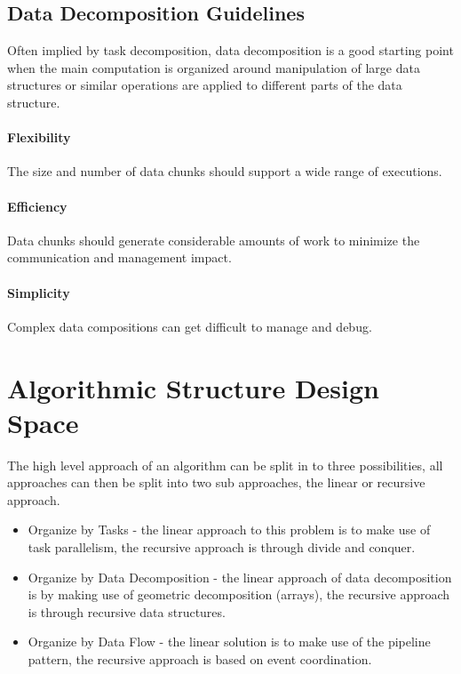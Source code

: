 \subsection{Data Decomposition Guidelines}

Often implied by task decomposition,
data decomposition is a good starting point when the main computation is organized around manipulation of large data structures
or similar operations are applied to different parts of the data structure.

\paragraph{Flexibility}
The size and number of data chunks should support a wide range of executions.

\paragraph{Efficiency}
Data chunks should generate considerable amounts of work to minimize the communication and management impact.

\paragraph{Simplicity}
Complex data compositions can get difficult to manage and debug.

\section{Algorithmic Structure Design Space}

The high level approach of an algorithm can be split in to three possibilities, all approaches can then be split into two sub approaches,
the linear or recursive approach.

\begin{itemize}
    \item Organize by Tasks - the linear approach to this problem is to make use of task parallelism, the recursive approach is through divide and conquer.
    \item Organize by Data Decomposition - the linear approach of data decomposition is by making use of geometric decomposition (arrays), the recursive approach is through recursive data structures.
    \item Organize by Data Flow - the linear solution is to make use of the pipeline pattern, the recursive approach is based on event coordination.
\end{itemize}

